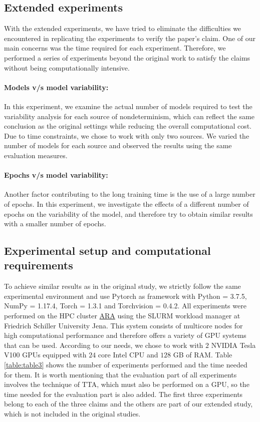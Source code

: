 \subsection{Extended experiments}
With the extended experiments, we have tried to eliminate the difficulties we encountered in replicating the experiments to verify the paper's claim. One of our main concerns was the time required for each experiment. Therefore, we performed a series of experiments beyond the original work to satisfy the claims without being computationally intensive.
\paragraph{Models v/s model variability:}
In this experiment, we examine the actual number of models required to test the variability analysis for each source of nondeterminism, which can reflect the same conclusion as the original settings while reducing the overall computational cost. Due to time constraints, we chose to work with only two sources. We varied the number of models for each source and observed the results using the same evaluation measures. 
\paragraph{Epochs v/s model variability:}
Another factor contributing to the long training time is the use of a large number of epochs. In this experiment, we investigate the effects of a different number of epochs on the variability of the model, and therefore try to obtain similar results with a smaller number of epochs.
 


\subsection{Experimental setup and computational requirements}
 
To achieve similar results as in the original study, we strictly follow the same experimental environment and use Pytorch as framework with Python = 3.7.5, NumPy = 1.17.4, Torch = 1.3.1 and Torchvision = 0.4.2. All experiments were performed on the HPC cluster \href{https://wiki.uni-jena.de/pages/viewpage.action?pageId=22453005}{ARA} using the SLURM workload manager at Friedrich Schiller University Jena. This system consists of multicore nodes for high computational performance and therefore offers a variety of GPU systems that can be used. According to our needs, we chose to work with $2$ NVIDIA Tesla V100 GPUs equipped with $24$ core Intel CPU and $128$ GB of RAM. Table \ref{table:table3} shows the number of experiments performed and the time needed for them. It is worth mentioning that the evaluation part of all experiments involves the technique of TTA, which must also be performed on a GPU, so the time needed for the evaluation part is also added. The first three experiments belong to each of the three claims and the others are part of our extended study, which is not included in the original studies.


